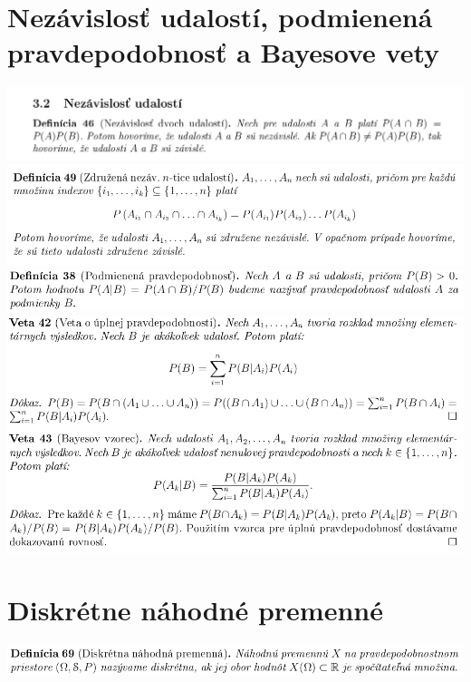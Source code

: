 \section{Nezávislosť udalostí, podmienená pravdepodobnosť a Bayesove vety}

\includegraphics[width=1\textwidth]{images/nezav_ud}\\
\includegraphics[width=1\textwidth]{images/zdruz_nezav}\\
\includegraphics[width=1\textwidth]{images/podmien_pravd}\\
\includegraphics[width=1\textwidth]{images/upln_pravd}\\

\section{Diskrétne náhodné premenné}

\includegraphics[width=1\textwidth]{images/disk_nah_prem}\\

